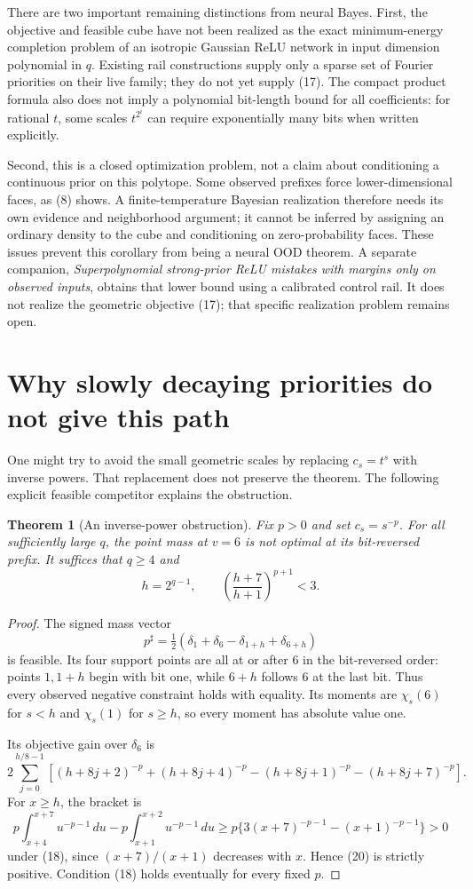 \documentclass[11pt]{article}
\newtheorem{theorem}{Theorem}\newtheorem{lemma}[theorem]{Lemma}
\begin{document}
There are two important remaining distinctions from neural Bayes.
First, the objective and feasible cube have not been realized as the
exact minimum-energy completion problem of an isotropic Gaussian ReLU
network in input dimension polynomial in $q$. Existing rail constructions
supply only a sparse set of Fourier priorities on their live family;
they do not yet supply (17). The compact product formula also does not
imply a polynomial bit-length bound for all coefficients: for rational
$t$, some scales $t^{2^i}$ can require exponentially many bits when
written explicitly.

Second, this is a closed optimization problem, not a claim about
conditioning a continuous prior on this polytope. Some observed prefixes
force lower-dimensional faces, as (8) shows. A finite-temperature Bayesian
realization therefore needs its own evidence and neighborhood argument;
it cannot be inferred by assigning an ordinary density to the cube and
conditioning on zero-probability faces. These issues prevent this corollary
from being a neural OOD theorem. A separate companion,
\emph{Superpolynomial strong-prior ReLU mistakes with margins only on
observed inputs}, obtains that lower bound using a calibrated control
rail. It does not realize the geometric objective (17); that specific
realization problem remains open.

\section{Why slowly decaying priorities do not give this path}
One might try to avoid the small geometric scales by replacing $c_s=t^s$
with inverse powers. That replacement does not preserve the theorem.
The following explicit feasible competitor explains the obstruction.

\begin{theorem}[An inverse-power obstruction]
Fix $p>0$ and set $c_s=s^{-p}$. For all sufficiently large $q$, the
point mass at $v=6$ is not optimal at its bit-reversed prefix. It suffices
that $q\ge4$ and
\[
 h=2^{q-1},\qquad
                  \left(\frac{h+7}{h+1}\right)^{p+1}<3. \tag{18}
\]
\end{theorem}
\begin{proof}
The signed mass vector
\[
       p^\sharp=\tfrac12(\delta_1+\delta_6-\delta_{1+h}
                                             +\delta_{6+h})
 \tag{19}
\]
is feasible. Its four support points are all at or after $6$ in the
bit-reversed order: points $1,1+h$ begin with bit one, while $6+h$
follows $6$ at the last bit. Thus every observed negative constraint
holds with equality. Its moments are $\chi_s(6)$ for $s<h$ and
$\chi_s(1)$ for $s\ge h$, so every moment has absolute value one.

Its objective gain over $\delta_6$ is
\[
 2\sum_{j=0}^{h/8-1}\left[
    (h+8j+2)^{-p}+(h+8j+4)^{-p}
    -(h+8j+1)^{-p}-(h+8j+7)^{-p}\right].              \tag{20}
\]
For $x\ge h$, the bracket is
\[
 p\int_{x+4}^{x+7}u^{-p-1}\,du
          -p\int_{x+1}^{x+2}u^{-p-1}\,du
 \ge p\{3(x+7)^{-p-1}-(x+1)^{-p-1}\}>0
\]
under (18), since $(x+7)/(x+1)$ decreases with $x$. Hence (20) is
strictly positive. Condition (18) holds eventually for every fixed $p$.
\end{proof}
\end{document}
